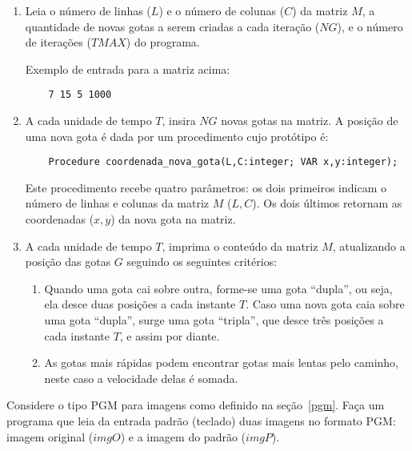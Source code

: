 \begin {enumerate}
\item 
Leia o número de linhas ($L$) e o número de colunas ($C$) da
matriz $M$, a quantidade de novas gotas a serem criadas a cada
iteração ($NG$), e o número de iterações ($TMAX$) do programa.

Exemplo de entrada para a matriz acima:
\begin{small}
\begin{verbatim}
    7 15 5 1000
\end{verbatim}
\end{small}

\item 
A cada unidade de tempo $T$, insira $NG$ novas gotas na matriz. A posição de 
uma nova gota é dada por um procedimento cujo protótipo é:
\begin{verbatim}
    Procedure coordenada_nova_gota(L,C:integer; VAR x,y:integer);
\end{verbatim}
Este procedimento 
recebe quatro parâmetros: os dois primeiros indicam o número de linhas e 
colunas da matriz $M$ ($L,C$). Os dois últimos retornam as coordenadas 
($x,y$) da nova gota na matriz.

\item
A cada unidade de tempo $T$, imprima o conteúdo da matriz $M$,
atualizando a posição das gotas $G$ seguindo os seguintes critérios:

        \begin{enumerate}
        \item
        Quando uma gota cai sobre outra, forme-se uma gota ``dupla'', ou seja, ela desce
        duas posições a cada instante $T$. Caso uma nova gota caia sobre uma gota
        ``dupla'', surge uma gota ``tripla'', que desce três posições a cada instante
        $T$, e assim por diante. 
        
        \item
        As gotas mais rápidas podem encontrar gotas mais lentas pelo caminho, neste caso
        a velocidade delas é somada.
        \end{enumerate}

\end{enumerate}



\item Considere o tipo PGM para imagens como definido na seção~\ref{pgm}.
Faça um programa que leia da entrada padrão 
(teclado) duas imagens no formato PGM: imagem original ($imgO$) e a imagem 
do padrão ($imgP$).
 
